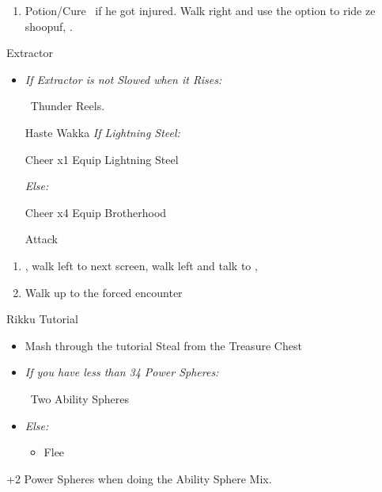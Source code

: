 \begin{enumerate}[resume]
	\item Potion/Cure \tidus\ if he got injured. Walk right and use the  option to ride ze shoopuf, \sd.
\end{enumerate}
\winvfill\lossvfill
\begin{battle}[4000]{Extractor}
	\begin{itemize}
		\tidusf Haste self
		\wakkaf Attack
		\tidusf Attack Extractor until you apply Slow
		\item \textit{If Extractor is not Slowed when it Rises:}
			\begin{itemize}
				\wakkaf \od\ Thunder Reels.
			\end{itemize}
		\tidusf Haste Wakka
		\tidusf \textit{If Lightning Steel:}
			\begin{itemize}
				\tidusf Cheer x1
				\tidusf Equip Lightning Steel
			\end{itemize}
		\textit{Else:}
			\begin{itemize}
				\tidusf Cheer x4
				\tidusf Equip Brotherhood
			\end{itemize}
		\tidusf Attack
	\end{itemize}
\end{battle}
\begin{enumerate}[resume]
	\item \sd, walk left to next screen, walk left and talk to \rikku, \sd
	\item Walk up to the forced encounter
\end{enumerate}
\begin{battle}{Rikku Tutorial}
	\begin{itemize}
		\item Mash through the tutorial
		\rikkuf Steal from the Treasure Chest
		\item \textit{If you have less than 34 Power Spheres:}
		      \begin{itemize}
			      \rikkuf \od\ Two Ability Spheres
		      \end{itemize}
		\item \textit{Else:}
		      \begin{itemize}
			      \rikkuf \od\ Two Potions
				  \rikkuf Defend
				  \item Flee
		      \end{itemize}
	\end{itemize}
+2 Power Spheres when doing the Ability Sphere Mix.
\end{battle}
